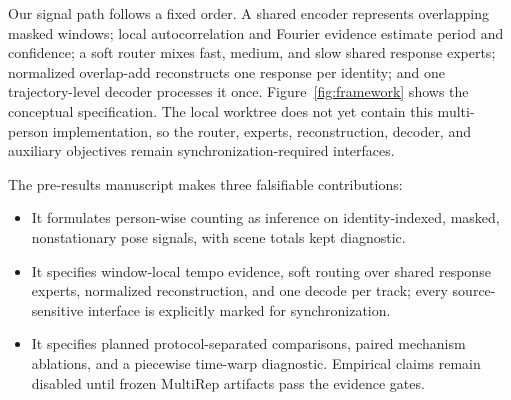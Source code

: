 Our signal path follows a fixed order. A shared encoder represents overlapping
masked windows; local autocorrelation and Fourier evidence estimate period and
confidence; a soft router mixes fast, medium, and slow shared response experts;
normalized overlap-add reconstructs one response per identity; and one
trajectory-level decoder processes it once. Figure~\ref{fig:framework} shows
the conceptual specification. The local worktree does not yet contain this
multi-person implementation, so the router, experts, reconstruction, decoder,
and auxiliary objectives remain synchronization-required interfaces.

The pre-results manuscript makes three falsifiable contributions:
\begin{itemize}
  \setlength\itemsep{0pt}
  \setlength\parskip{0pt}
  \item It formulates person-wise counting as inference on identity-indexed,
  masked, nonstationary pose signals, with scene totals kept diagnostic.
  \item It specifies window-local tempo evidence, soft routing over shared
  response experts, normalized reconstruction, and one decode per track; every
  source-sensitive interface is explicitly marked for synchronization.
  \item It specifies planned protocol-separated comparisons, paired mechanism
  ablations, and a piecewise time-warp diagnostic. Empirical claims remain
  disabled until frozen MultiRep artifacts pass the evidence gates.
\end{itemize}
